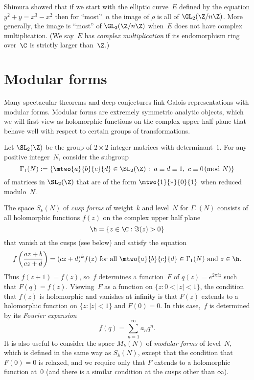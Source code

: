 \documentclass{report}
\begin{document}
Shimura showed
that if we start with the elliptic curve~$E$
defined by the equation $y^2+y = x^3-x^2$
then for ``most''~$n$ the image of $\rho$ is all of $\GL_2(\Z/n\Z)$.
More generally, the image is ``most'' of $\GL_2(\Z/n\Z)$ when~$E$
does not have complex multiplication.  (We say~$E$ has
{\em complex multiplication} if its endomorphism ring over~$\C$
is strictly larger than~$\Z$.)

\section{Modular forms}\label{sec:modformintro}
Many spectacular theorems and deep conjectures link Galois
representations with modular forms.  Modular forms are extremely
symmetric analytic objects, which we will first view as holomorphic
functions on the complex upper half plane that behave well with
respect to certain groups of transformations.

Let $\SL_2(\Z)$ be the group of $2\times 2$ integer matrices
with determinant~$1$.
For any positive integer~$N$, consider the subgroup
$$\Gamma_1(N):=\left\{
\mtwo{a}{b}{c}{d}
 \in \SL_2(\Z) \, :\,
a\equiv d\equiv 1,\,\, c\equiv 0 \!\!\pmod{N}  \right\}
$$
of matrices in $\SL_2(\Z)$ that are of the form
$\mtwo{1}{*}{0}{1}$ when reduced modulo~$N$.

The space $S_k(N)$ of {\em cusp forms} of weight~$k$ and
level~$N$ for $\Gamma_1(N)$ consists of
all holomorphic functions $f(z)$ on the complex upper half plane
$$
  \h=\{z\in\C : \Im(z)>0\}
$$
that vanish at the cusps (see below) and satisfy the equation
\begin{equation*}
f\left(\frac{az+b}{cz+d}\right)=(cz+d)^k f(z) \text{ for all }
\mtwo{a}{b}{c}{d}
\in \Gamma_1(N)\text{ and }z \in \h.
\end{equation*}
Thus $f(z+1)=f(z)$, so~$f$ determines
a function~$F$ of $q(z)=e^{2\pi i z}$ such that $F(q)=f(z)$.
Viewing~$F$ as a function on $\{z:0<|z|<1\}$, the condition that $f(z)$
is holomorphic and
vanishes at infinity is that $F(z)$ extends to a holomorphic
function on $\{z:|z|<1\}$ and $F(0)=0$.
In this case,~$f$ is determined by its {\em Fourier expansion}
$$
  f(q)=\sum_{n=1}^{\infty}a_n q^n.
$$
It is also useful to consider the space $M_k(N)$
of {\em modular forms} of level~$N$, which is defined in the
same way as $S_k(N)$, except that the condition that $F(0)=0$
is relaxed, and we require only that $F$ extends to a holomorphic
function at~$0$ (and there is a similar condition at the
cusps other than $\infty$).
\end{document}
